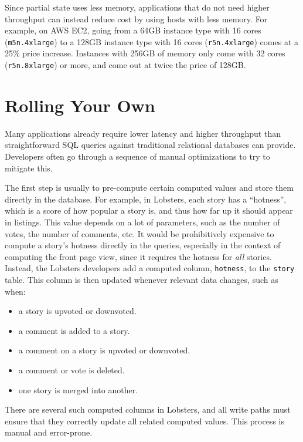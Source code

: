 Since partial state uses less memory, applications that do not need higher
throughput can instead reduce cost by using hosts with less memory. For example,
on AWS EC2, going from a 64GB instance type with 16 cores (\texttt{m5n.4xlarge})
to a 128GB instance type with 16 cores (\texttt{r5n.4xlarge}) comes at a 25\%
price increase. Instances with 256GB of memory only come with 32 cores
(\texttt{r5n.8xlarge}) or more, and come out at twice the price of 128GB.

\section{Rolling Your Own}
\label{s:eval:alts}

Many applications already require lower latency and higher throughput than
straightforward SQL queries against traditional relational databases can
provide. Developers often go through a sequence of manual optimizations to try
to mitigate this.

The first step is usually to pre-compute certain computed values and store them
directly in the database. For example, in Lobsters, each story has a
``hotness'', which is a score of how popular a story is, and thus how far up it
should appear in listings. This value depends on a lot of parameters, such as
the number of votes, the number of comments, etc. It would be prohibitively
expensive to compute a story's hotness directly in the queries,
especially in the context of computing the front page view, since it requires
the hotness for \emph{all} stories. Instead, the Lobsters developers add a
computed column, \texttt{hotness}, to the \texttt{story} table. This column is
then updated whenever relevant data changes, such as when:

\begin{itemize}
    \item a story is upvoted or downvoted.
    \item a comment is added to a story.
    \item a comment on a story is upvoted or downvoted.
    \item a comment or vote is deleted.
    \item one story is merged into another.
\end{itemize}

There are several such computed columns in Lobsters, and all write paths must
ensure that they correctly update all related computed values. This process is
manual and error-prone.

